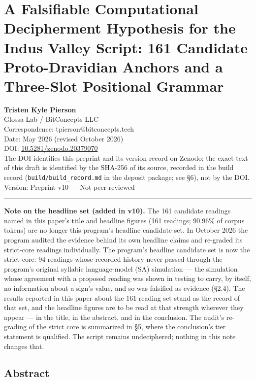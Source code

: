 \documentclass[
]{article}
\author{}
\date{}
\begin{document}
\section{A Falsifiable Computational Decipherment Hypothesis for the Indus Valley Script: 161 Candidate Proto-Dravidian Anchors and a Three-Slot Positional Grammar}\label{computational-decipherment-hypothesis-indus-valley-script}

\textbf{Tristen Kyle Pierson}\\
Glossa-Lab / BitConcepts LLC\\
Correspondence: tpierson@bitconcepts.tech\\
Date: May 2026 (revised October 2026)\\
DOI: \href{https://doi.org/10.5281/zenodo.20379070}{10.5281/zenodo.20379070}\\
The DOI identifies this preprint and its version record on Zenodo; the exact text of this draft is identified by the SHA-256 of its source, recorded in the build record (\texttt{build/build\_record.md} in the deposit package; see §6), not by the DOI.\\
Version: Preprint v10 --- Not peer-reviewed

\begin{center}\rule{0.5\linewidth}{0.5pt}\end{center}

\textbf{Note on the headline set (added in v10).} The 161 candidate readings named in this paper's title and headline figures (161 readings; 90.96\% of corpus tokens) are no longer this program's headline candidate set. In October 2026 the program audited the evidence behind its own headline claims and re-graded its strict-core readings individually. The program's headline candidate set is now the strict core: 94 readings whose recorded history never passed through the program's original syllabic language-model (SA) simulation --- the simulation whose agreement with a proposed reading was shown in testing to carry, by itself, no information about a sign's value, and so was falsified as evidence (§2.4). The results reported in this paper about the 161-reading set stand as the record of that set, and the headline figures are to be read at that strength wherever they appear --- in the title, in the abstract, and in the conclusion. The audit's re-grading of the strict core is summarized in §5, where the conclusion's tier statement is qualified. The script remains undeciphered; nothing in this note changes that.

\subsection{Abstract}\label{abstract}
\end{document}
